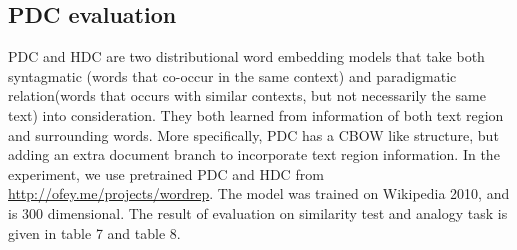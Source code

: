 \documentclass[a4paper, 11pt]{article}
\begin{document}
\subsection{PDC evaluation}
PDC and HDC are two distributional word embedding models that take both syntagmatic (words that co-occur
in the same context) and paradigmatic relation(words that occurs with similar contexts, but not necessarily the same text) into consideration. They both learned from information of both text region and surrounding words. More specifically, PDC has a CBOW like structure, but adding an extra document branch to incorporate text region information. In the experiment, we use pretrained PDC and HDC from  \href{http://ofey.me/projects/wordrep/}{http://ofey.me/projects/wordrep}. The model was trained on Wikipedia 2010, and is 300 dimensional. The result of evaluation on similarity test and analogy task is given in table 7 and table 8.
\begin{table}[ht!]
\centering
{}
\caption{Similarity result of PDC}
\label{tab:my-table}
\end{table}
\begin{table}[ht!]
\centering
{}
\caption{Analogy tasks on PDC }
\label{tab:my-table}
\end{table}
\end{document}

